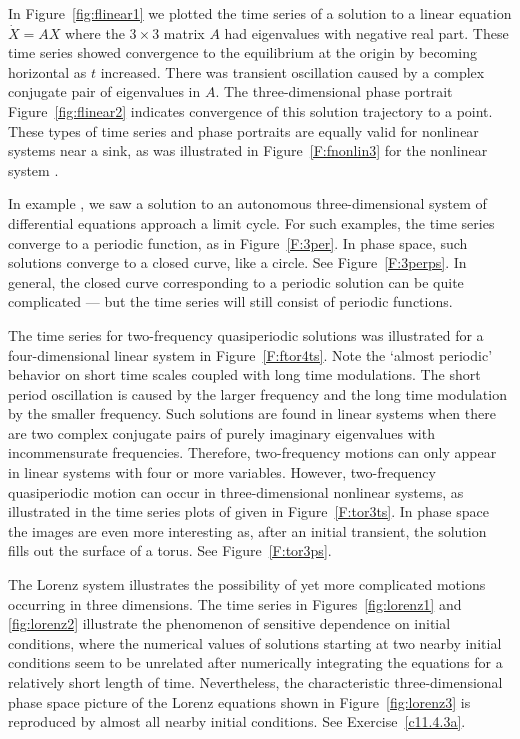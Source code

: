 \documentclass{ximera}
\begin{document}
In Figure~\ref{fig:flinear1} we plotted the time series of a solution to a 
linear equation $\dot{X}=AX$ where the $3\times 3$ matrix $A$ had eigenvalues
with negative real part.  These time series showed convergence to the 
equilibrium at the origin by becoming horizontal as $t$ increased.  There was
transient oscillation caused by a complex conjugate pair of eigenvalues in 
$A$.  The three-dimensional phase portrait Figure~\ref{fig:flinear2} indicates
convergence of this solution trajectory to a point.  These types of time 
series and phase portraits are equally valid for nonlinear systems near a sink,
as was illustrated in Figure~\ref{F:fnonlin3} for the nonlinear system .

In example , we saw a solution to an autonomous three-dimensional 
system of differential equations approach a limit cycle.  For such 
examples, the time series converge to a periodic function, as in 
Figure~\ref{F:3per}.  In phase space, such solutions converge to a closed 
curve, like a circle.  See Figure~\ref{F:3perps}.   In general, the closed 
curve corresponding to a periodic solution can be quite complicated --- but 
the time series will still consist of periodic functions.

The time series for two-frequency quasiperiodic solutions was illustrated for
a four-dimensional linear system in Figure~\ref{F:ftor4ts}.  Note the `almost 
periodic' behavior on short time scales coupled with long time modulations.
The short period oscillation is caused by the larger frequency and the long 
time modulation by the smaller frequency.  Such solutions are found in linear 
systems when there are two complex conjugate pairs of purely imaginary 
eigenvalues with incommensurate frequencies.  Therefore, two-frequency 
motions can only appear in linear systems with four or more variables.  
However, two-frequency quasiperiodic motion can occur in three-dimensional 
nonlinear systems, as illustrated in the time series plots of  
given in Figure~\ref{F:tor3ts}.  In phase space the images are even more 
interesting as, after an initial transient, the solution fills out the 
surface of a torus.  See Figure~\ref{F:tor3ps}.

The Lorenz system  illustrates the possibility of yet more 
complicated motions occurring in three dimensions.  The time series in 
Figures~\ref{fig:lorenz1} and \ref{fig:lorenz2} illustrate the phenomenon of 
sensitive dependence on initial conditions, where the numerical values of 
solutions starting at two nearby initial conditions seem to be unrelated 
after numerically integrating the equations for a relatively short length of 
time.  Nevertheless, the characteristic three-dimensional phase space picture 
of the Lorenz equations shown in Figure~\ref{fig:lorenz3} is reproduced by 
almost all nearby initial conditions.  See Exercise~\ref{c11.4.3a}.
 
\end{document}
